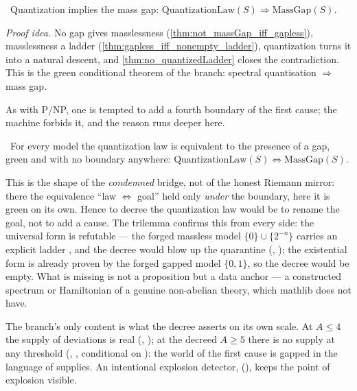 \begin{theorem}\label{thm:massGap_of_quantizationLaw}
\green{}\ Quantization implies the mass gap: $\mathrm{QuantizationLaw}(S)\Rightarrow\mathrm{MassGap}(S)$.
\end{theorem}

\emph{Proof idea.} No gap gives masslessness (\cref{thm:not_massGap_iff_gapless}), masslessness a
ladder (\cref{thm:gapless_iff_nonempty_ladder}), quantization turns it into a natural descent, and
\cref{thm:no_quantizedLadder} closes the contradiction. This is the green conditional theorem of the
branch: spectral quantisation $\Rightarrow$ mass gap.

As with P/NP, one is tempted to add a fourth boundary of the first cause; the machine forbids it,
and the reason runs deeper here.

\begin{theorem}\label{thm:quantizationLaw_iff_massGap}
\green{}\ For every model the quantization law is equivalent to the presence of a gap, green and
with no boundary anywhere: $\mathrm{QuantizationLaw}(S)\iff\mathrm{MassGap}(S)$.
\end{theorem}

This is the shape of the \emph{condemned} bridge, not of the honest Riemann mirror: there the
equivalence ``law $\iff$ goal'' held only \emph{under} the boundary, here it is green on its own.
Hence to decree the quantization law would be to rename the goal, not to add a cause. The trilemma
confirms this from every side: the universal form is refutable --- the forged massless model
$\{0\}\cup\{2^{-n}\}$ carries an explicit ladder , and the decree would blow up
the quarantine (, \green{}); the existential form is
already proven by the forged gapped model $\{0,1\}$, so the decree would be empty. What is missing is
not a proposition but a \red{} data anchor --- a constructed spectrum or Hamiltonian of a genuine
non-abelian theory, which mathlib does not have.

The branch's only \yellow{} content is what the decree asserts on its own scale. At $A\le 4$ the
supply of deviations is real (, \green{}); at the decreed
$A\ge 5$ there is no supply at any threshold
(, \yellow{}, conditional on \axiom{}): the world of the
first cause is gapped in the language of supplies. An intentional explosion detector,
 (\yellow{}), keeps the point of
explosion visible.

